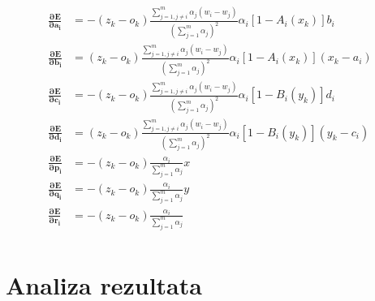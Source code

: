 \documentclass[paper=a4, fontsize=11pt]{scrartcl} %
\numberwithin{equation}{section} %
\numberwithin{figure}{section} %
\numberwithin{table}{section} %
\begin{document}
\begin{align*}
\mathbf{\frac{\partial E}{\partial a_i}} &= - (z_k - o_k) \frac{\sum_{j = 1, j \neq i}^{m} \alpha_j (w_i - w_j)}{(\sum_{j=1}^{m} \alpha_j)^2 } \alpha_i [1 - A_i(x_k)]b_i \\
\mathbf{\frac{\partial E}{\partial b_i}} &= (z_k - o_k) \frac{\sum_{j = 1, j \neq i}^{m} \alpha_j (w_i - w_j)}{(\sum_{j=1}^{m} \alpha_j)^2 } \alpha_i [1 - A_i(x_k)](x_k - a_i) \\
\mathbf{\frac{\partial E}{\partial c_i}}  &= -(z_k - o_k) \frac{\sum_{j = 1, j \neq i}^{m} \alpha_j (w_i - w_j)}{(\sum_{j=1}^{m} \alpha_j)^2 } \alpha_i [1 - B_i(y_k)]d_i \\
\mathbf{\frac{\partial E}{\partial d_i}} &= (z_k - o_k) \frac{\sum_{j = 1, j \neq i}^{m} \alpha_j (w_i - w_j)}{(\sum_{j=1}^{m} \alpha_j)^2 } \alpha_i [1 - B_i(y_k)](y_k - c_i)\\
\mathbf{\frac{\partial E}{\partial p_i}} &= - (z_k - o_k) \frac{\alpha_i}{\sum_{j=1}^{m} \alpha_j} x \\
\mathbf{\frac{\partial E}{\partial q_i}} &= - (z_k - o_k) \frac{\alpha_i}{\sum_{j=1}^{m} \alpha_j} y \\
\mathbf{\frac{\partial E}{\partial r_i}} &= - (z_k - o_k) \frac{\alpha_i}{\sum_{j=1}^{m} \alpha_j} \\
\end{align*}


\section{Analiza rezultata}
\end{document}
